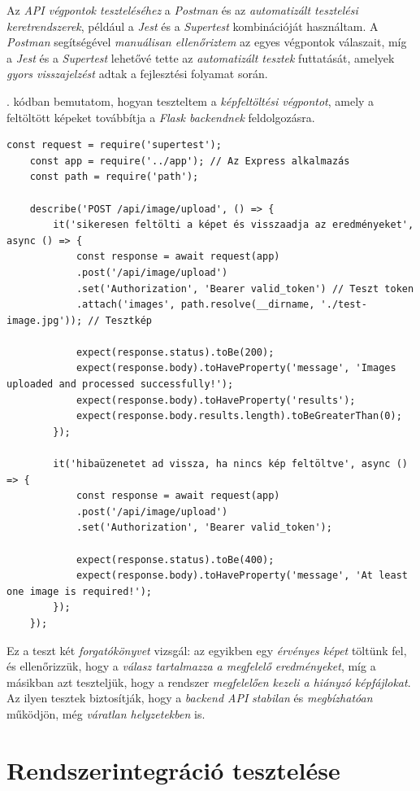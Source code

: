 \documentclass[
]{thesis-ekf}
\theoremstyle{definition}
\theoremstyle{remark}
\begin{document}
Az \emph{API végpontok teszteléséhez} a \emph{Postman} és az \emph{automatizált tesztelési keretrendszerek}, például a \emph{Jest} és a \emph{Supertest} kombinációját használtam. A \emph{Postman} segítségével \emph{manuálisan ellenőriztem} az egyes végpontok válaszait, míg a \emph{Jest} és a \emph{Supertest} lehetővé tette az \emph{automatizált tesztek} futtatását, amelyek \emph{gyors visszajelzést} adtak a fejlesztési folyamat során.

. kódban bemutatom, hogyan teszteltem a \emph{képfeltöltési végpontot}, amely a feltöltött képeket továbbítja a \emph{Flask backendnek} feldolgozásra.

\begin{lstlisting}[style=myjavascript, caption={Backend tesztelés}, label=kod-javascript2]
	const request = require('supertest');
	const app = require('../app'); // Az Express alkalmazás
	const path = require('path');
	
	describe('POST /api/image/upload', () => {
		it('sikeresen feltölti a képet és visszaadja az eredményeket', async () => {
			const response = await request(app)
			.post('/api/image/upload')
			.set('Authorization', 'Bearer valid_token') // Teszt token
			.attach('images', path.resolve(__dirname, './test-image.jpg')); // Tesztkép
			
			expect(response.status).toBe(200);
			expect(response.body).toHaveProperty('message', 'Images uploaded and processed successfully!');
			expect(response.body).toHaveProperty('results');
			expect(response.body.results.length).toBeGreaterThan(0);
		});
		
		it('hibaüzenetet ad vissza, ha nincs kép feltöltve', async () => {
			const response = await request(app)
			.post('/api/image/upload')
			.set('Authorization', 'Bearer valid_token');
			
			expect(response.status).toBe(400);
			expect(response.body).toHaveProperty('message', 'At least one image is required!');
		});
	});
\end{lstlisting}

Ez a teszt két \emph{forgatókönyvet} vizsgál: az egyikben egy \emph{érvényes képet} töltünk fel, és ellenőrizzük, hogy a \emph{válasz tartalmazza a megfelelő eredményeket}, míg a másikban azt teszteljük, hogy a rendszer \emph{megfelelően kezeli a hiányzó képfájlokat}. Az ilyen tesztek biztosítják, hogy a \emph{backend API} \emph{stabilan} és \emph{megbízhatóan} működjön, még \emph{váratlan helyzetekben} is.

\section{Rendszerintegráció tesztelése}
\end{document}
